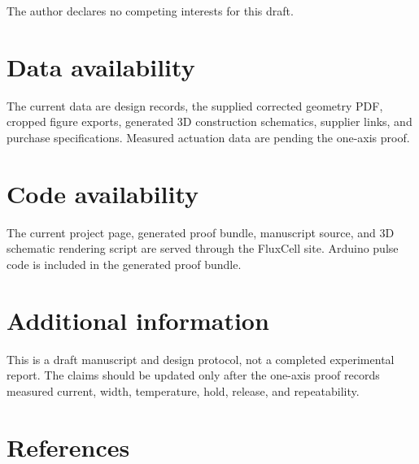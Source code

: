 \documentclass[12pt,letterpaper]{article}
\begin{document}
The author declares no competing interests for this draft.

\section{Data availability}

The current data are design records, the supplied corrected geometry PDF, cropped figure exports, generated 3D construction schematics, supplier links, and purchase specifications. Measured actuation data are pending the one-axis proof.

\section{Code availability}

The current project page, generated proof bundle, manuscript source, and 3D schematic rendering script are served through the FluxCell site. Arduino pulse code is included in the generated proof bundle.

\section{Additional information}

This is a draft manuscript and design protocol, not a completed experimental report. The claims should be updated only after the one-axis proof records measured current, width, temperature, hold, release, and repeatability.

\section{References}

\printbibliography[heading=none]
\end{document}
